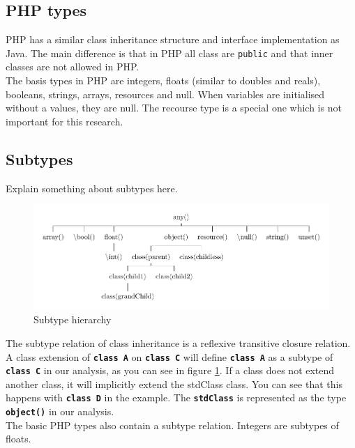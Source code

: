 \documentclass[../main.tex]{subfiles}
\begin{document}
    \subsection{PHP types}
    PHP has a similar class inheritance structure and interface implementation as Java.
    The main difference is that in PHP all class are \texttt{public} and that inner classes are not allowed in PHP. 
    \\
    The basis types in PHP are integers, floats (similar to doubles and reals), booleans, strings, arrays, resources and null.
    When variables are initialised without a values, they are null. The recourse type is a special one which is not important for this research.
 
    \subsection{Subtypes}
    
    Explain something about subtypes here.

    \blindtext %
    
    \begin{figure}[H]
        \includegraphics{Diagrams/Subtypes.pdf}
        \caption{Subtype hierarchy}
        \label{fig:subtypes}
    \end{figure}

    The subtype relation of class inheritance is a \gls{reflexive transitive closure} relation.
    A class extension of \textbf{\texttt{class A}} on \textbf{\texttt{class C}} will define \textbf{\texttt{class A}} as a subtype of \textbf{\texttt{class C}} in our analysis, as you can see in figure \ref{fig:subtypes}.
    If a class does not extend another class, it will implicitly extend the \gls{stdClass} class.
    You can see that this happens with \textbf{\texttt{class D}} in the example.
    The \textbf{\texttt{stdClass}} is represented as the type \textbf{\texttt{object()}} in our analysis.
    \\
    The basic PHP types also contain a subtype relation.
    Integers are subtypes of floats.
 
\end{document}
